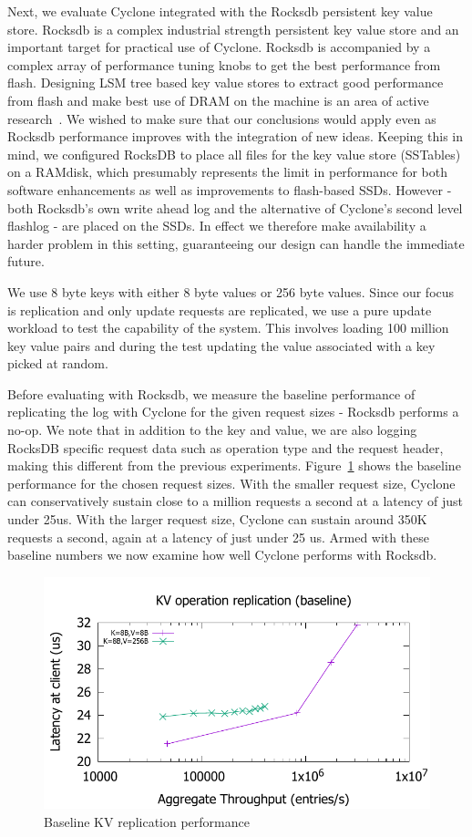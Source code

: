\documentclass[pageno]{jpaper}
\begin{document}
Next, we evaluate Cyclone integrated with the Rocksdb persistent key value
store. Rocksdb is a complex industrial strength persistent key value store and
an important target for practical use of Cyclone.  Rocksdb is accompanied by a
complex array of performance tuning knobs to get the best performance from
flash. Designing LSM tree based key value stores to extract good performance
from flash and make best use of DRAM on the machine is an area of active
research~\cite{flodb, triad}. We wished to make sure that our conclusions would
apply even as Rocksdb performance improves with the integration of new
ideas. Keeping this in mind, we configured RocksDB to place all files for the
key value store (SSTables) on a RAMdisk, which presumably represents the limit
in performance for both software enhancements as well as improvements to
flash-based SSDs. However - both Rocksdb's own write ahead log and the
alternative of Cyclone's second level flashlog - are placed on the SSDs. In
effect we therefore make availability a harder problem in this setting,
guaranteeing our design can handle the immediate future.

We use 8 byte keys with either 8 byte values or 256 byte values.  Since our
focus is replication and only update requests are replicated, we use a pure
update workload to test the capability of the system. This involves loading 100
million key value pairs and during the test updating the value associated with a
key picked at random.

Before evaluating with Rocksdb, we measure the baseline performance of
replicating the log with Cyclone for the given request sizes - Rocksdb performs
a no-op. We note that in addition to the key and value, we are also logging
RocksDB specific request data such as operation type and the request header,
making this different from the previous experiments.
Figure~\ref{fig:kv_baseline} shows the baseline performance for the chosen
request sizes. With the smaller request size, Cyclone can conservatively sustain
close to a million requests a second at a latency of just under 25us. With the
larger request size, Cyclone can sustain around 350K requests a second, again at
a latency of just under 25 us. Armed with these baseline numbers we now examine
how well Cyclone performs with Rocksdb.

\begin{figure}
\includegraphics[scale=0.6]{results2/kv_baseline.pdf}
\caption{Baseline KV replication performance}
\label{fig:kv_baseline}
\end{figure}
\end{document}
